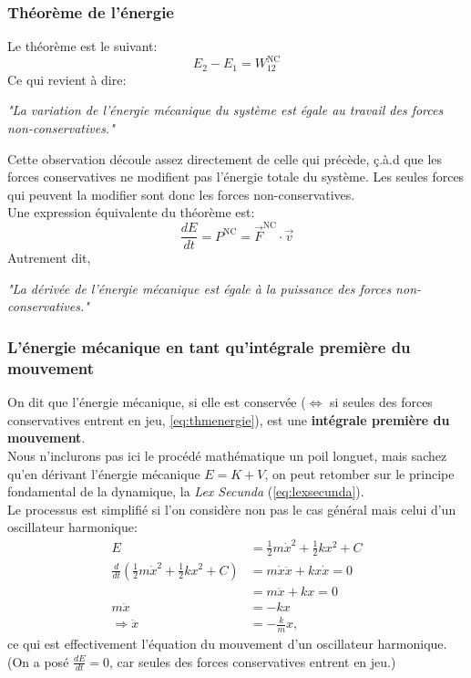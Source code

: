 \documentclass{article}
\numberwithin{equation}{section}
\begin{document}
\subsubsection{Théorème de l'énergie}
Le théorème est le suivant:
\begin{equation} \label{eq:thmenergie}
	\boxed{ E_2 - E_1 = W_{12}^\text{NC} }
\end{equation}
Ce qui revient à dire:
\begin{center}
	\emph{"La variation de l'énergie mécanique du système est égale au travail des forces non-conservatives."}
\end{center}
Cette observation découle assez directement de celle qui précède, ç.à.d que les forces conservatives ne modifient pas l'énergie totale du système. Les seules forces qui peuvent la modifier sont donc les forces non-conservatives. \\

Une expression équivalente du théorème est:
\begin{equation}
	\boxed{ \frac{dE}{dt} = P^\text{NC} = \vec F^\text{NC} \cdot \vec v }
\end{equation}
Autrement dit,
\begin{center}
	\emph{"La dérivée de l'énergie mécanique est égale à la puissance des forces non-conservatives."}
\end{center}

\subsubsection{L'énergie mécanique en tant qu'intégrale première du mouvement}
On dit que l'énergie mécanique, si elle est conservée (\(\Leftrightarrow\) si seules des forces conservatives entrent en jeu, \ref{eq:thmenergie}), est une \textbf{intégrale première du mouvement}. \\

Nous n'inclurons pas ici le procédé mathématique un poil longuet, mais sachez qu'en dérivant l'énergie mécanique \(E = K + V\), on peut retomber sur le principe fondamental de la dynamique, la \emph{Lex Secunda} (\ref{eq:lexsecunda}). \\
Le processus est simplifié si l'on considère non pas le cas général mais celui d'un oscillateur harmonique:
\begin{align*}
	E &= \frac{1}{2} m \dot x^2 + \frac{1}{2} k x^2 + C \\
	\frac{d}{dt}\left ( \frac{1}{2} m \dot x^2 + \frac{1}{2} k x^2 + C \right ) &= m \dot x \ddot x + k x \dot x = 0 \\
	&= m \ddot x + k x = 0 \\
	m \ddot x &= -k x \\
	\Rightarrow \ddot x &= -\frac{k}{m} x,
\end{align*}
ce qui est effectivement l'équation du mouvement d'un oscillateur harmonique. \\
(On a posé \(\frac{dE}{dt} = 0\), car seules des forces conservatives entrent en jeu.)
\end{document}
